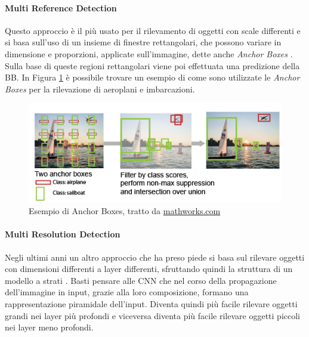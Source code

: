 \paragraph{Multi Reference Detection}
Questo approccio è il più usato per il rilevamento di oggetti con scale differenti e si basa sull'uso di un insieme di finestre rettangolari, che possono variare in dimensione e proporzioni, applicate sull'immagine, dette anche \textit{Anchor Boxes} \cite{ren2015faster, liu2016ssd, redmon2017yolo9000}. Sulla base di queste regioni rettangolari viene poi effettuata una predizione della \ac{BB}. In Figura \ref{fig:anchor_Example} è possibile trovare un esempio di come sono utilizzate le \textit{Anchor Boxes} per la rilevazione di aeroplani e imbarcazioni. 
\begin{figure}[]
    \centering
    \includegraphics[width=\textwidth]{images/examples/anchorbox_predictionsrefine.png}
    \caption{Esempio di Anchor Boxes, tratto da \href{https://it.mathworks.com/help/vision/ug/anchor-boxes-for-object-detection.html}{mathworks.com}}
    \label{fig:anchor_Example}
\end{figure}
\paragraph{Multi Resolution Detection}
Negli ultimi anni un altro approccio che ha preso piede si basa sul rilevare oggetti con dimensioni differenti a layer differenti, sfruttando quindi la struttura di un modello a strati \cite{liu2016ssd, lin2017feature, zhang2018single, cai2016unified}. Basti pensare alle \ac{CNN} che nel corso della propagazione dell'immagine in input, grazie alla loro composizione, formano una rappresentazione piramidale dell'input. Diventa quindi più facile rilevare oggetti grandi nei layer più profondi e viceversa diventa più facile rilevare oggetti piccoli nei layer meno profondi. 
